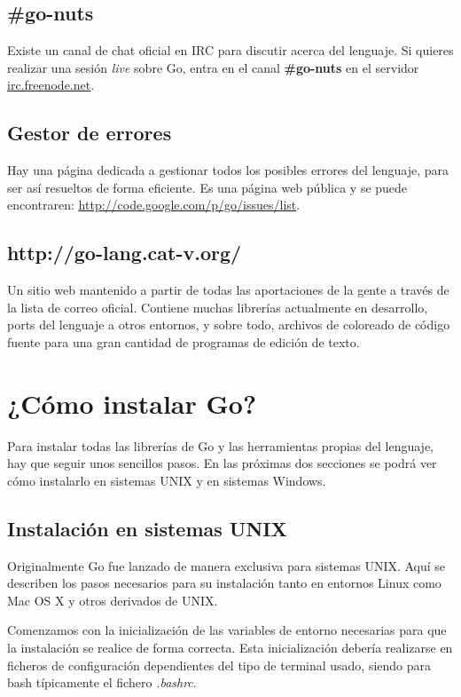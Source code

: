 	\subsection{\#go-nuts}
	
	Existe un canal de chat oficial en IRC para discutir acerca del lenguaje. Si
	quieres realizar una sesión \emph{live} sobre Go, entra en el canal
	\textbf{\#go-nuts} en el servidor \url{irc.freenode.net}.
	
	\subsection{Gestor de errores}
	
	Hay una página dedicada a gestionar todos los posibles errores del lenguaje,
	para ser así resueltos de forma eficiente. Es una página web pública y se
	puede encontraren: \url{http://code.google.com/p/go/issues/list}.
	
	\subsection{http://go-lang.cat-v.org/}
	
	Un sitio web mantenido a partir de todas las aportaciones de la gente
	a través de la lista de correo oficial. Contiene muchas librerías
	actualmente en desarrollo, ports del lenguaje a otros entornos, y sobre
	todo, archivos de coloreado de código fuente para una gran cantidad de
	programas de edición de texto.	

\section{¿Cómo instalar Go?}

Para instalar todas las librerías de Go y las herramientas propias del lenguaje,
hay que seguir unos sencillos pasos. En las próximas dos secciones se podrá ver
cómo instalarlo en sistemas UNIX y en sistemas Windows.

\subsection{Instalación en sistemas UNIX}

	Originalmente Go fue lanzado de manera exclusiva para sistemas UNIX. Aquí se
	describen los pasos necesarios para su instalación tanto en entornos Linux
	como Mac OS X y otros derivados de UNIX.

	Comenzamos con la inicialización de las variables de entorno necesarias para
	que la instalación se realice de forma correcta. Esta inicialización debería
	realizarse en ficheros de configuración dependientes del tipo de terminal
	usado, siendo para bash típicamente el fichero \emph{.bashrc}.

